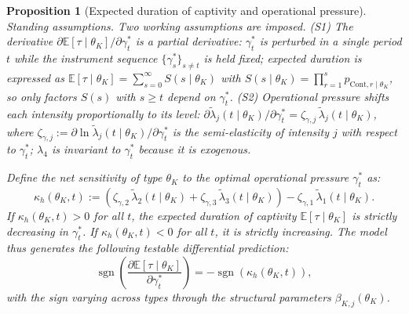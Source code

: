 \documentclass[ecta,nameyear,draft]{econsocart}
\theoremstyle{plain}
\newtheorem{proposition}[theorem]{Proposition}
\theoremstyle{definition}
\newcommand{\1}{\mathbf{1}}
\begin{document}
\begin{proposition}[Expected duration of captivity and operational pressure]
\label{prop:expected-captivity-gamma}
\noindent\textit{Standing assumptions.} Two working assumptions are imposed. \textup{(S1)} The derivative $\partial\mathbb{E}[\tau\mid\theta_K]/\partial\gamma_t^\ast$ is a partial derivative: $\gamma_t^\ast$ is perturbed in a single period $t$ while the instrument sequence $\{\gamma_s^\ast\}_{s\neq t}$ is held fixed; expected duration is expressed as $\mathbb{E}[\tau\mid\theta_K]=\sum_{s=0}^{\infty}S(s\mid\theta_K)$ with $S(s\mid\theta_K)=\prod_{r=1}^{s}p_{\mathrm{Cont},r\mid\theta_K}$, so only factors $S(s)$ with $s\geq t$ depend on $\gamma_t^\ast$. \textup{(S2)} Operational pressure shifts each intensity proportionally to its level: $\partial\tilde{\lambda}_j(t\mid\theta_K)/\partial\gamma_t^\ast=\zeta_{\gamma,j}\,\tilde{\lambda}_j(t\mid\theta_K)$, where $\zeta_{\gamma,j}:=\partial\ln\tilde{\lambda}_j(t\mid\theta_K)/\partial\gamma_t^\ast$ is the semi-elasticity of intensity $j$ with respect to $\gamma_t^\ast$; $\lambda_4$ is invariant to $\gamma_t^\ast$ because it is exogenous.

\medskip
Define the net sensitivity of type $\theta_K$ to the optimal operational pressure $\gamma_t^\ast$ as:
\begin{equation}
\label{eq:kappa-c}
\kappa_h(\theta_K, t) := \left( \zeta_{\gamma,2}\, \tilde{\lambda}_2(t \mid \theta_K) + \zeta_{\gamma,3}\, \tilde{\lambda}_3(t \mid \theta_K) \right) - \zeta_{\gamma,1}\, \tilde{\lambda}_1(t \mid \theta_K).
\end{equation}
If $\kappa_h(\theta_K, t) > 0$ for all $t$, the expected duration of captivity $\mathbb{E}[\tau \mid \theta_K]$ is strictly decreasing in $\gamma_t^\ast$. If $\kappa_h(\theta_K, t) < 0$ for all $t$, it is strictly increasing. The model thus generates the following testable differential prediction:
\begin{equation}
\operatorname{sgn} \left( \frac{\partial \mathbb{E}[\tau \mid \theta_K]}{\partial \gamma_t^\ast} \right) = - \operatorname{sgn}(\kappa_h(\theta_K, t)),
\end{equation}
with the sign varying across types through the structural parameters $\beta_{K,j}(\theta_K)$.
\end{proposition}
\end{document}
